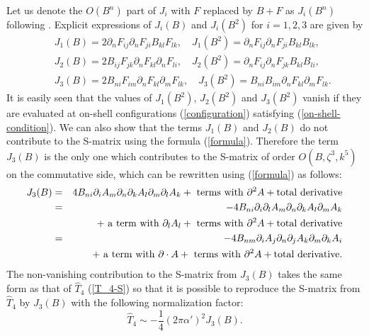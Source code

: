 \documentclass[a4paper,12pt]{article}
\begin{document}
Let us denote the $O(B^n)$ part of $J_i$
with $F$ replaced by $B+F$ as $J_i (B^n)$ following \cite{Okawa}.
Explicit expressions of $J_i (B)$ and $J_i (B^2)$ for $i=1, 2, 3$
are given by
\begin{eqnarray}
&& J_1 (B) = 2 \partial_n F_{ij} \partial_n F_{ji} B_{kl} F_{lk},
\quad J_1 (B^2) = \partial_n F_{ij} \partial_n F_{ji} B_{kl} B_{lk},
\nonumber \\
&& J_2 (B) = 2 B_{ij} F_{jk} \partial_n F_{kl} \partial_n F_{li},
\quad J_2 (B^2) = \partial_n F_{ij} \partial_n F_{jk} B_{kl} B_{li},
\nonumber \\
&& J_3 (B) = 2 B_{ni} F_{im} \partial_n F_{kl} \partial_m F_{lk},
\quad J_3 (B^2) = B_{ni} B_{im} \partial_n F_{kl} \partial_m F_{lk}.
\end{eqnarray}
It is easily seen that the values of $J_1 (B^2)$, $J_2 (B^2)$
and $J_3 (B^2)$ vanish if they are evaluated
at on-shell configurations
(\ref{configuration}) satisfying (\ref{on-shell-condition}).
We can also show that the terms $J_1 (B)$ and $J_2 (B)$
do not contribute
to the S-matrix using the formula (\ref{formula}).
Therefore the term $J_3 (B)$ is
the only one which contributes to the S-matrix
of order $O(B, \zeta^3, k^5)$ on the commutative side,
which can be rewritten
using (\ref{formula}) as follows:
\begin{eqnarray}
J_3 (B) &=& 4 B_{ni} \partial_i A_m \partial_n \partial_k A_l
\partial_m \partial_l A_k + {\rm ~terms~with~} \partial^2 A
+ {\rm total~derivative}
\nonumber \\
&=& -4 B_{ni} \partial_i \partial_l A_m \partial_n \partial_k A_l
\partial_m A_k
\nonumber \\
&& + {\rm ~a~term~with~} \partial_l A_l
+ {\rm ~terms~with~} \partial^2 A
+ {\rm total~derivative}
\nonumber \\
&=& -4 B_{nm} \partial_i A_j
\partial_n \partial_j A_k \partial_m \partial_k A_i
\nonumber \\
&& + {\rm ~a~term~with~} \partial \cdot A
+ {\rm ~terms~with~} \partial^2 A
+ {\rm total~derivative}.
\end{eqnarray}
The non-vanishing contribution to the S-matrix from $J_3 (B)$
takes the same form as that of $\hat{T}_4$ (\ref{T_4-S})
so that it is possible to reproduce the S-matrix from $\hat{T}_4$
by $J_3 (B)$ with the following normalization factor:
\begin{equation}
\hat{T}_4 \sim -\frac{1}{4} (2 \pi \alpha')^2 J_3 (B).
\label{T_4-J_3}
\end{equation}
\end{document}
